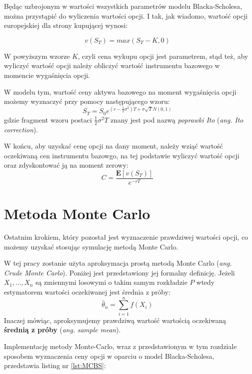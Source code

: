 \documentclass{pracamgr}
\begin{document}
Będąc uzbrojonym w wartości wszystkich parametrów modelu Blacka-Scholesa, można przystąpić
do wyliczenia wartości opcji. I tak, jak wiadomo, wartość opcji europejskiej dla strony kupującej 
wynosi:

\begin{equation}
  v(S_T) = max(S_T-K, 0)
\end{equation}

W powyższym wzorze $K$, czyli cena wykupu opcji jest parametrem, stąd też,  aby wyliczyć wartość opcji należy obliczyć wartość instrumentu bazowego w momencie wygaśnięcia opcji.

W modelu tym, wartość ceny aktywa bazowego na moment wygaśnięcia opcji możemy wyznaczyć przy pomocy następującego wzoru:
\begin{equation}
  S_T = S_0 e^{(r - \frac{1}{2} \sigma^2)T+\sigma \sqrt{T} N(0,1)}
\end{equation}
gdzie fragment wzoru postaci $\frac{1}{2} \sigma^2 T$ znany jest pod nazwą \textit{poprawki Ito} (\textit{ang. Ito correction}).

W końcu, aby uzyskać cenę opcji na dany moment, należy wziąć wartość oczekiwaną cen instrumentu bazowgo, na tej podstawie wyliczyć wartość opcji oraz zdyskontować ją na moment zerowy:
\begin{equation}
  C = \frac{\mathbf{E}[v(S_T)]}{e^{-rT}}
\end{equation}

\section{Metoda Monte Carlo}

Ostatnim krokiem, który pozostał jest wyznaczenie prawdziwej wartości opcji, co możemy uzyskać 
stosując symulację metodą Monte Carlo.

W tej pracy zostanie użyta aproksymacja prostą metodą Monte Carlo (\textit{ang. Crude Monte Carlo}). 
Poniżej jest przedstawiony jej formalny definicję.
Jeżeli $X_1, ..., X_n$ są zmiennymi losowymi o takim samym rozkładzie $P$ wtedy estymatorem wartości
oczekiwanej jest średnia z próby:
\begin{equation}
  \hat{\theta}_n = \sum_{i=1}^n f(X_i) 
\end{equation}
Inaczej mówiąc, aproksymujemy prawdziwą wartość wartością oczekiwaną \textbf{średnią z próby} (\textit{ang. sample mean}).

Implementację metody Monte-Carlo, wraz z przedstawionym w tym rozdziale sposobem wyznaczenia 
ceny opcji w oparciu o model Blacka-Scholesa, przedstawia listing nr \ref{lst:MCBS}:
\end{document}
